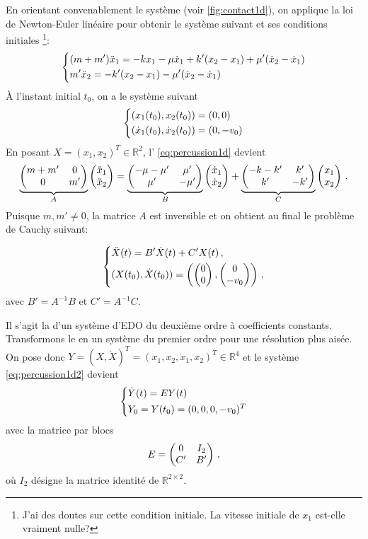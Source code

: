 \noindent En orientant convenablement le système (voir \cref{fig:contact1d}), on applique la loi de Newton-Euler linéaire
pour obtenir le système suivant et ses conditions initiales \footnote{J'ai des doutes sur cette condition
initiale. La vitesse initiale de $x_1$ est-elle vraiment nulle?}:
\begin{align}
    \begin{dcases}
    (m+m')\ddot x_1 = -kx_1 - \mu \dot x_1 + k'(x_2 - x_1) + \mu'(\dot x_2 - \dot x_1) \\
        m' \ddot x_2 =  -k'(x_2 - x_1) - \mu'(\dot x_2 - \dot x_1) 
    \end{dcases}
\end{align}
À l'instant initial $t_0$, on a le système suivant
\begin{align} \label{eq:percussion1d}
    \begin{dcases}
    (x_1(t_0), x_2(t_0)) = (0,0) \\
    (\dot x_1(t_0), \dot x_2(t_0)) = (0,-v_0)
    \end{dcases}
\end{align}
En posant $X = (x_1, x_2)^T \in \mathbb{R}^2$, l' \cref{eq:percussion1d} devient
\begin{align}
    \underbrace{\begin{pmatrix} m+m' & 0 \\ 0 & m' \end{pmatrix}}_{A} \begin{pmatrix} \ddot{x}_1 \\ \ddot{x}_2 \end{pmatrix} = \underbrace{\begin{pmatrix} -\mu -
    \mu^\prime & \mu' \\ \mu' & -\mu' \end{pmatrix}}_{B}
    \begin{pmatrix} \dot{x}_1 \\ \dot{x}_2 \end{pmatrix} + \underbrace{\begin{pmatrix} -k-k' & k' \\ k' & -k' \end{pmatrix}}_{C} \begin{pmatrix} x_1 \\ x_2 \end{pmatrix} \,.
\end{align}
Puisque $m, m'\neq 0$, la matrice $A$ est inversible et on obtient au final le problème de Cauchy suivant:

\begin{align} \label{eq:percussion1d2}
    \begin{dcases}
        \ddot{X}(t) = B' \dot{X}(t) + C'X(t) \,, \\
        (X(t_0), \dot X (t_0)) = \left( \begin{pmatrix} 0 \\ 0 \end{pmatrix}, \begin{pmatrix} 0 \\ -v_0 \end{pmatrix} \right) \,,
    \end{dcases}
\end{align}
avec $B' = A^{-1}B$ et $C' = A^{-1}C$.

\noindent Il s'agit la d'un système d'EDO du deuxième ordre à coefficients constants. Transformons le en un système du
premier ordre pour
une
résolution plus aisée. On pose donc $Y= (X, \dot X)^T = (x_1, x_2, \dot{x}_1, \dot{x}_2)^T \in \mathbb{R}^4$ et le
système
\ref{eq:percussion1d2}
devient
\begin{align} \label{eq:systeme1d}
    \begin{dcases}
        \dot{Y}(t)= E Y(t) \\
        Y_0 = Y(t_0) = (0,0,0,-v_0)^T
    \end{dcases}
\end{align}
avec la matrice par blocs \[ E = \begin{pmatrix} 0 & I_2 \\ C' & B' \end{pmatrix} \,, \] où $I_2$ désigne la matrice identité de
$\mathbb{R}^{2\times2}$.

